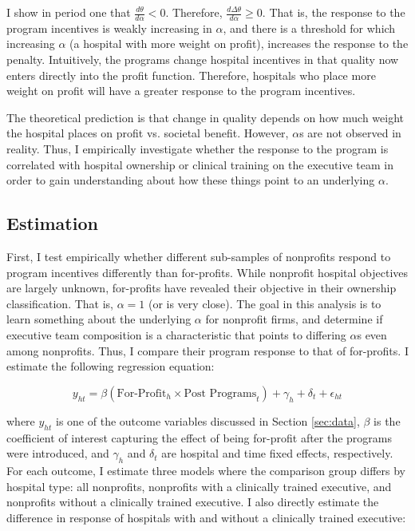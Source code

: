 \documentclass[12pt]{article}
\begin{document}
    I show in period one that $\frac{d\theta}{d\alpha}<0$. Therefore, $\frac{d\Delta\theta}{d\alpha}\geq0$. That is, the response to the program incentives is weakly increasing in $\alpha$, and there is a threshold for which increasing $\alpha$ (a hospital with more weight on profit), increases the response to the penalty. Intuitively, the programs change hospital incentives in that quality now enters directly into the profit function. Therefore, hospitals who place more weight on profit will have a greater response to the program incentives. 

    The theoretical prediction is that change in quality depends on how much weight the hospital places on profit vs. societal benefit. However, $\alpha$s are not observed in reality. Thus, I empirically investigate whether the response to the program is correlated with hospital ownership or clinical training on the executive team in order to gain understanding about how these things point to an underlying $\alpha$. 

    \subsection{Estimation}

    First, I test empirically whether different sub-samples of nonprofits respond to program incentives differently than for-profits. While nonprofit hospital objectives are largely unknown, for-profits have revealed their objective in their ownership classification. That is, $\alpha=1$ (or is very close). The goal in this analysis is to learn something about the underlying $\alpha$ for nonprofit firms, and determine if executive team composition is a characteristic that points to differing $\alpha$s even among nonprofits. Thus, I compare their program response to that of for-profits. I estimate the following regression equation:

    \begin{equation}
    \label{eq:forprofit}
    y_{ht} = \beta (\text{For-Profit}_h \times \text{Post Programs}_t) + \gamma_{h} + \delta_t + \epsilon_{ht}
    \end{equation}

    \noindent where $y_{ht}$ is one of the outcome variables discussed in Section \ref{sec:data}, $\beta$ is the coefficient of interest capturing the effect of being for-profit after the programs were introduced, and $\gamma_h$ and $\delta_t$ are hospital and time fixed effects, respectively. For each outcome, I estimate three models where the comparison group differs by hospital type: all nonprofits, nonprofits with a clinically trained executive, and nonprofits without a clinically trained executive. I also directly estimate the difference in response of hospitals with and without a clinically trained executive:
\end{document}
